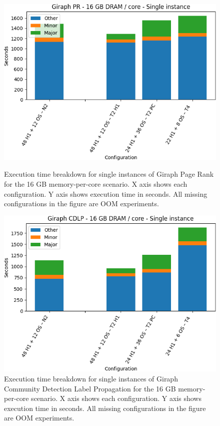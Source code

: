 \begin{figure}[thbp]
        \centering
    \includegraphics[width=\linewidth]{./fig/g_pr128_single.png}
    \caption{Execution time breakdown for single instances of Giraph
    Page Rank for the 16 GB memory-per-core scenario. X axis shows each configuration.
Y axis shows execution time in seconds. All missing configurations in the figure are OOM experiments.}
    \label{fig:g_pr128_single}
    \includegraphics[width=\linewidth]{./fig/g_cdlp128_single.png}
    \caption{Execution time breakdown for single instances of Giraph
    Community Detection Label Propagation for the 16 GB memory-per-core scenario. X axis shows each configuration.
Y axis shows execution time in seconds. All missing configurations in the figure are OOM experiments.}
    \label{fig:g_cdlp128_single}
\end{figure}


